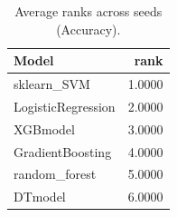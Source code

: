 \begin{table}[t]
\centering
\begin{tabular}{lr}
\toprule
Model & rank \\
\midrule
sklearn_SVM & 1.0000 \\
LogisticRegression & 2.0000 \\
XGBmodel & 3.0000 \\
GradientBoosting & 4.0000 \\
random_forest & 5.0000 \\
DTmodel & 6.0000 \\
\bottomrule
\end{tabular}
\caption{Average ranks across seeds (Accuracy).}
\label{tab:avg_rank_Accuracy}
\end{table}
